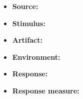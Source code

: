 \subsubsection{}

\begin{itemize}
	\item \textbf{Source:} 
	\item \textbf{Stimulus:} 
	\item \textbf{Artifact:} 
	\item \textbf{Environment:} 
	\item \textbf{Response:} 
	\item \textbf{Response measure:} 
\end{itemize}